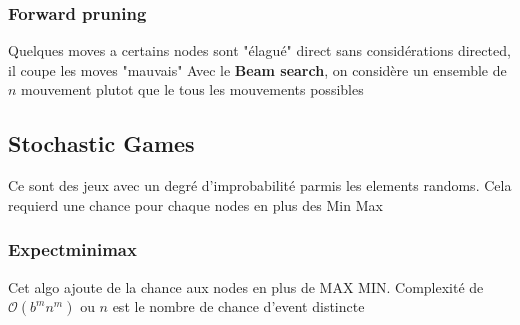 		\subsubsection{Forward pruning}
			Quelques moves a certains nodes sont "élagué" direct sans considérations directed, il coupe les moves "mauvais"
			Avec le \textbf{Beam search}, on considère un ensemble de $n$ mouvement plutot que le tous les mouvements possibles
			
	\subsection{Stochastic Games}
		Ce sont des jeux avec un degré d'improbabilité parmis les elements randoms. Cela requierd une chance pour chaque nodes en plus des Min Max
		
		
		\subsubsection{Expectminimax}
			Cet algo ajoute de la chance aux nodes en plus de MAX MIN. Complexité de $\mathcal{O}(b^{m}n^{m})$ ou $n$ est le nombre de chance d'event distincte